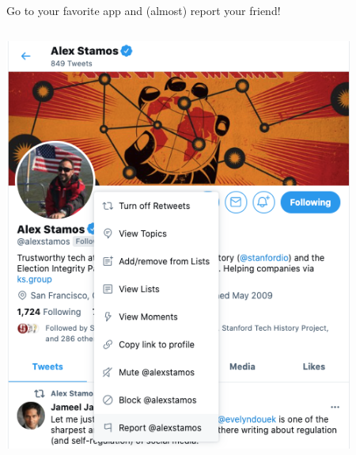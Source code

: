 \documentclass[nobackground,dvipsnames,table,aspectratio=169]{beamer}
\begin{document}
\begin{frame}{Go to your favorite app and (almost) report your friend!}
    \centering
    \begin{columns}
            \includegraphics[width=0.9\textwidth]{block-alex-stamos-1}

\end{columns}
\end{frame}
\end{document}
